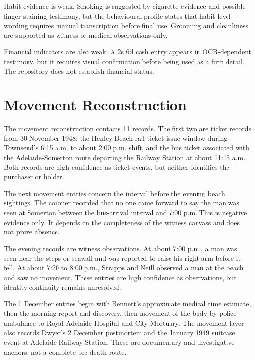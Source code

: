 Habit evidence is weak. Smoking is suggested by cigarette evidence and possible finger-staining testimony, but the behavioural profile states that habit-level wording requires manual transcription before final use. Grooming and cleanliness are supported as witness or medical observations only.

Financial indicators are also weak. A 2s 6d cash entry appears in OCR-dependent testimony, but it requires visual confirmation before being used as a firm detail. The repository does not establish financial status.

\section{Movement Reconstruction}

The movement reconstruction contains 11 records. The first two are ticket records from 30 November 1948: the Henley Beach rail ticket issue window during Townsend's 6:15 a.m. to about 2:00 p.m. shift, and the bus ticket associated with the Adelaide-Somerton route departing the Railway Station at about 11:15 a.m. Both records are high confidence as ticket events, but neither identifies the purchaser or holder.

The next movement entries concern the interval before the evening beach sightings. The coroner recorded that no one came forward to say the man was seen at Somerton between the bus-arrival interval and 7:00 p.m. This is negative evidence only. It depends on the completeness of the witness canvass and does not prove absence.

The evening records are witness observations. At about 7:00 p.m., a man was seen near the steps or seawall and was reported to raise his right arm before it fell. At about 7:20 to 8:00 p.m., Strapps and Neill observed a man at the beach and saw no movement. These entries are high confidence as observations, but identity continuity remains unresolved.

The 1 December entries begin with Bennett's approximate medical time estimate, then the morning report and discovery, then movement of the body by police ambulance to Royal Adelaide Hospital and City Mortuary. The movement layer also records Dwyer's 2 December postmortem and the January 1949 suitcase event at Adelaide Railway Station. These are documentary and investigative anchors, not a complete pre-death route.

